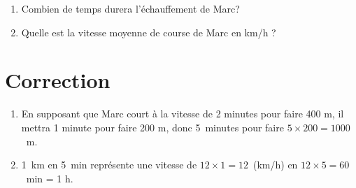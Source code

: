 \documentclass[11pt]{article}
\begin{document}
\begin{enumerate}
\item Combien de temps durera l'échauffement de Marc? 
\item Quelle est la vitesse moyenne de course de Marc en km/h ? 
\end{enumerate}


\newpage

\section*{Correction}

\begin{enumerate}
\item En supposant que Marc court  à la vitesse de 2 minutes pour faire 400 m, il mettra 1 minute pour faire 200 m, donc 5~minutes pour faire $5 \times 200 = 1000$~m.
\item 1~km en 5~min représente une vitesse de $12 \times 1 = 12$~(km/h) en $12 \times 5 = 60$~min = 1 h. 
\end{enumerate}

 
\end{document}
